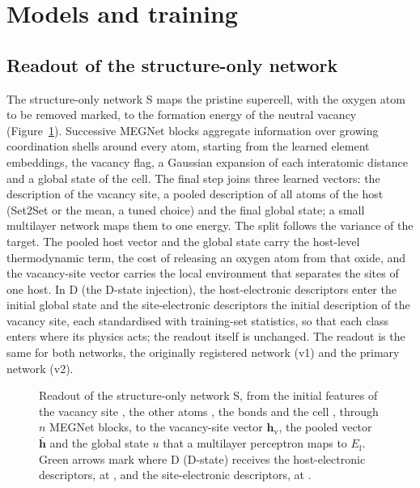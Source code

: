 \section{Models and training}
\label{si:training}

\subsection{Readout of the structure-only network}

The structure-only network S maps the pristine supercell, with the oxygen atom to be removed marked, to the
formation energy of the neutral vacancy (Figure~\ref{fig:readout}). Successive MEGNet blocks
\citep{Chen2019graph} aggregate information over growing coordination shells around every atom, starting from the
learned element embeddings, the vacancy flag, a Gaussian expansion of each interatomic distance and a global state
of the cell. The final step joins three learned vectors: the description of the vacancy site, a pooled description
of all atoms of the host (Set2Set or the mean, a tuned choice) and the final global state; a small multilayer
network maps them to one energy. The split follows the variance of the target. The pooled host vector and the
global state carry the host-level thermodynamic term, the cost of releasing an oxygen atom from that oxide, and
the vacancy-site vector carries the local environment that separates the sites of one host. In D (the D-state
injection), the host-electronic descriptors enter the initial global state and the site-electronic descriptors the
initial description of the vacancy site, each standardised with training-set statistics, so that each class enters
where its physics acts; the readout itself is unchanged. The readout is the same for both networks, the
originally registered network (v1) and the primary network (v2).

\begin{figure}[htbp]
\centering
{}
\caption{Readout of the structure-only network S, from the initial features of the vacancy site \xvzero{}, the other atoms
\xizero{}, the bonds \eijzero{} and the cell \uzero{}, through $n$ MEGNet blocks, to the vacancy-site vector
$\mathbf{h}_\mathrm{v}$, the pooled vector $\bar{\mathbf{h}}$ and the global state $u$ that a multilayer perceptron
maps to $E_\mathrm{f}$. Green arrows mark where D (D-state) receives the host-electronic descriptors, at \uzero{},
and the site-electronic descriptors, at \xvzero{}.}
\label{fig:readout}
\end{figure}

